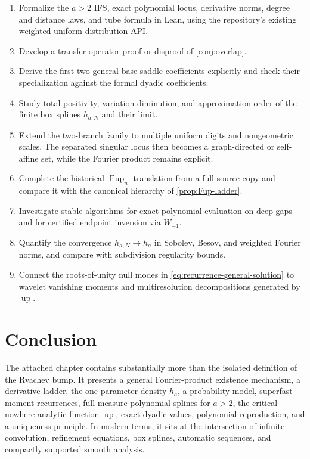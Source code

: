 \documentclass[11pt,oneside]{article}
\theoremstyle{definition}
\theoremstyle{remark}
\newcommand{\Up}{\operatorname{up}}
\begin{document}
\begin{enumerate}
\item Formalize the $a>2$ IFS, exact polynomial locus, derivative norms, degree and distance laws,
      and tube formula in Lean, using the repository's existing weighted-uniform distribution API.
\item Develop a transfer-operator proof or disproof of \cref{conj:overlap}.
\item Derive the first two general-base saddle coefficients explicitly and check their
      specialization against the formal dyadic coefficients.
\item Study total positivity, variation diminution, and approximation order of the finite
      box splines $h_{a,N}$ and their limit.
\item Extend the two-branch family to multiple uniform digits and nongeometric scales.  The
      separated singular locus then becomes a graph-directed or self-affine set, while the
      Fourier product remains explicit.
\item Complete the historical $\operatorname{Fup}_n$ translation from a full source copy and
      compare it with the canonical hierarchy of \cref{prop:Fup-ladder}.
\item Investigate stable algorithms for exact polynomial evaluation on deep gaps and for
      certified endpoint inversion via $W_{-1}$.
\item Quantify the convergence $h_{a,N}\to h_a$ in Sobolev, Besov, and weighted Fourier norms,
      and compare with subdivision regularity bounds.
\item Connect the roots-of-unity null modes in \eqref{eq:recurrence-general-solution} to
      wavelet vanishing moments and multiresolution decompositions generated by $\Up$.
\end{enumerate}

\section{Conclusion}

The attached chapter contains substantially more than the isolated definition of the
Rvachev bump.  It presents a general Fourier-product existence mechanism, a derivative
ladder, the one-parameter density $h_a$, a probability model, superfast moment recurrences,
full-measure polynomial splines for $a>2$, the critical nowhere-analytic function $\Up$,
exact dyadic values, polynomial reproduction, and a uniqueness principle.  In modern terms,
it sits at the intersection of infinite convolution, refinement equations, box splines,
automatic sequences, and compactly supported smooth analysis.
\end{document}
